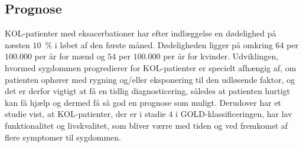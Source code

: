  
\subsection{Prognose}
KOL-patienter med eksacerbationer har efter indlæggelse en dødelighed på næsten $10$~$\%$ i løbet af den første måned. Dødeligheden ligger på omkring $64$ per $100.000$ per år for mænd og $54$ per $100.000$ per år for kvinder.
Udviklingen, hvormed sygdommen progredierer for KOL-patienter er specielt afhængig af, om patienten ophører med rygning og/eller eksponering til den udløsende faktor, og det er derfor vigtigt at få en tidlig diagnosticering, således at patienten hurtigt kan få hjælp og dermed få så god en prognose som muligt. \cite{dsam2016}
Derudover har et studie vist, at KOL-patienter, der er i stadie $4$ i GOLD-klassificeringen, har lav funktionalitet og livskvalitet, som bliver værre med tiden og ved fremkomst af flere symptomer til sygdommen. \cite{Habraken2011}

